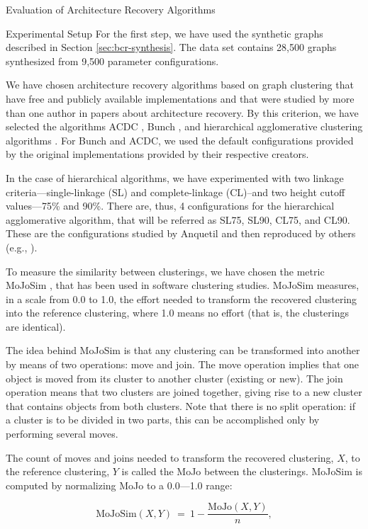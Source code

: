 \documentclass[11pt,twocolumn,a4paper,english]{article}
\begin{document}
\begin{section}{Evaluation of Architecture Recovery Algorithms}
\begin{subsection}{Experimental Setup}
	For the first step, we have used the synthetic graphs described in Section \ref{sec:bcr-synthesis}. The data set contains 28,500 graphs synthesized from 9,500 parameter configurations.
	
	We have chosen architecture recovery algorithms based on graph clustering that have free and publicly available implementations and that were studied by more than one author in papers about architecture recovery. By this criterion, we have selected the algorithms ACDC \cite{Tzerpos2000}, Bunch \cite{Mancoridis1998}, and hierarchical agglomerative clustering algorithms \cite{Anquetil1999}. For Bunch and ACDC, we used the default configurations provided by the original implementations provided by their respective creators.
		
	In the case of hierarchical algorithms, we have experimented with two linkage criteria---single-linkage (SL) and complete-linkage (CL)--and two height cutoff values---75\% and 90\%. There are, thus, 4 configurations for the hierarchical agglomerative algorithm, that will be referred as SL75, SL90, CL75, and CL90. These are the configurations studied by Anquetil  \cite{Anquetil1999,Anquetil2003} and then reproduced by others (e.g., \cite{Wu2005}).
	
	To measure the similarity between clusterings, we have chosen the metric MoJoSim \cite{Bittencourt2009}, that has been used in software clustering studies. MoJoSim measures, in a scale from 0.0 to 1.0, the effort needed to transform the recovered clustering into the reference clustering, where 1.0 means no effort (that is, the clusterings are identical).
	
	The idea behind MoJoSim is that any clustering can be transformed into another by means of two operations: move and join. The move operation implies that one object is moved from its cluster to another cluster (existing or new). The join operation means that two clusters are joined together, giving rise to a new cluster that contains objects from both clusters. Note that there is no split operation: if a cluster is to be divided in two parts, this can be accomplished only by performing several moves.
	
	The count of moves and joins needed to transform the recovered clustering, $X$, to the reference clustering, $Y$ is called the MoJo between the clusterings. MoJoSim is computed by normalizing MoJo to a 0.0---1.0 range:
	
	$$
	\mathrm{MoJoSim}(X, Y) ~=~ 1 - \frac{\mathrm{MoJo}(X, Y)}{n}\mathrm{,}
	$$
	

\end{subsection}
\end{section}
\end{document}
